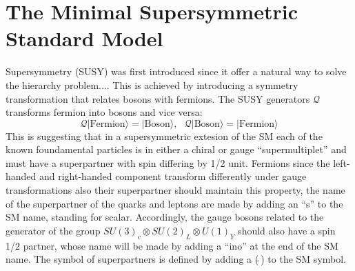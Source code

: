 \section{The Minimal Supersymmetric Standard Model}
Supersymmetry (SUSY) was first introduced since it offer a natural way to solve the hierarchy problem....\cite{}
This is achieved by introducing a symmetry transformation that relates bosons with fermions. The SUSY generators $\mathcal{Q}$ 
transforms fermion into bosons and vice versa:
\begin{equation}
\mathcal{Q}|\text{Fermion}\rangle = |\text{Boson}\rangle, ~ ~ ~ \mathcal{Q}|\text{Boson}\rangle = |\text{Fermion}\rangle
\end{equation}
This is suggesting that in a supersymmetric extesion of the SM \cite{page7Martins} each of the known foundamental particles 
is in either a chiral or gauge ``supermultiplet'' and must have a superpartner with spin differing by 1/2 unit.
Fermions since the left-handed and right-handed component transform differently under gauge transformations also their superpartner 
should maintain this property, the name of the superpartner of the quarks and leptons are made by adding an ``s'' to the SM name, standing for scalar.
Accordingly, the gauge bosons related to the generator of the group $SU(3)_c \otimes SU(2)_L \otimes U(1)_Y$ should also have a spin 1/2 partner,
whose name will be made by adding a ``ino'' at the end of the SM name. The symbol of superpartners is defined by adding a ($\tilde{ ~ }$) to the SM symbol.

